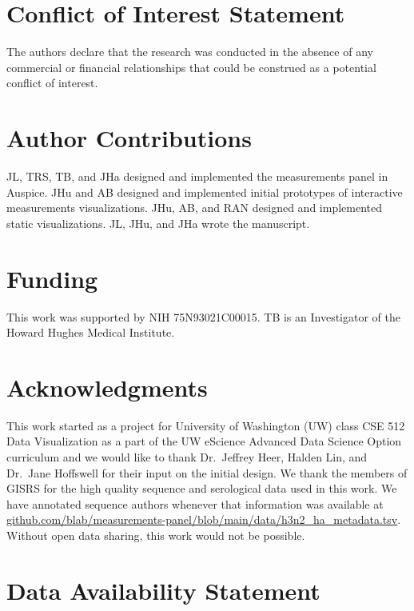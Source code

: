 \documentclass[utf8]{FrontiersinHarvard} %
\begin{document}
\section*{Conflict of Interest Statement}

The authors declare that the research was conducted in the absence of any commercial or financial relationships that could be construed as a potential conflict of interest.

\section*{Author Contributions}

JL, TRS, TB, and JHa designed and implemented the measurements panel in Auspice.
JHu and AB designed and implemented initial prototypes of interactive measurements visualizations.
JHu, AB, and RAN designed and implemented static visualizations.
JL, JHu, and JHa wrote the manuscript.

\section*{Funding}

This work was supported by NIH 75N93021C00015.
TB is an Investigator of the Howard Hughes Medical Institute.

\section*{Acknowledgments}

This work started as a project for University of Washington (UW) class CSE 512 Data Visualization as a part of the UW eScience Advanced Data Science Option curriculum and we would like to thank Dr.\ Jeffrey Heer, Halden Lin, and Dr.\ Jane Hoffswell for their input on the initial design.
We thank the members of GISRS for the high quality sequence and serological data used in this work.
We have annotated sequence authors whenever that information was available at \href{https://github.com/blab/measurements-panel/blob/main/data/h3n2_ha_metadata.tsv}{github.com/blab/measurements-panel/blob/main/data/h3n2\_ha\_metadata.tsv}.
Without open data sharing, this work would not be possible.

\section*{Data Availability Statement}
\end{document}
